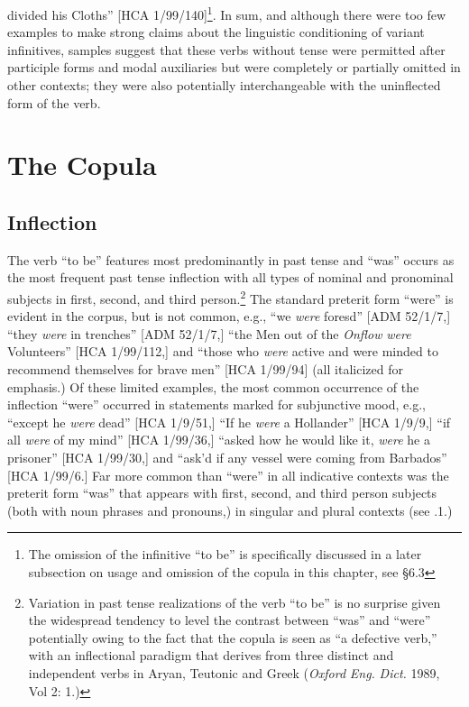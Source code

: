 divided his Cloths” [HCA 1/99/140]\footnote{The omission of the infinitive “to be” is specifically discussed in a later subsection on usage and omission of the copula in this chapter, see §6.3}. In sum, and although there were too few examples to make strong claims about the linguistic conditioning of variant infinitives, samples suggest that these verbs without tense were permitted after participle forms and modal auxiliaries but were completely or partially omitted in other contexts; they were also potentially interchangeable with the uninflected form of the verb.

\section{\textbf{The} \textbf{Copula}}%

\subsection{\textbf{Inflection}}%

  The verb “to be” features most predominantly in past tense and “was” occurs as the most frequent past tense inflection with all types of nominal and pronominal subjects in first, second, and third person.\footnote{Variation in past tense realizations of the verb “to be” is no surprise given the widespread tendency to level the contrast between “was” and “were” potentially owing to the fact that the copula is seen as “a defective verb,” with an inflectional paradigm that derives from three distinct and independent verbs in Aryan, Teutonic and Greek (\textit{Oxford} \textit{Eng.} \textit{Dict.} 1989, Vol 2: 1.)}  The standard preterit form “were” is evident in the corpus, but is not common, e.g., “we \textit{were} foresd” [ADM 52/1/7,] “they \textit{were} in trenches” [ADM 52/1/7,] “the Men out of the \textit{Onflow} \textit{were} Volunteers” [HCA 1/99/112,] and “those who \textit{were} active and were minded to recommend themselves for brave men” [HCA 1/99/94] (all italicized for emphasis.) Of these limited examples, the most common occurrence of the inflection “were” occurred in statements marked for subjunctive mood, e.g., “except he \textit{were} dead” [HCA 1/9/51,] “If he \textit{were} a Hollander” [HCA 1/9/9,] “if all \textit{were} of my mind” [HCA 1/99/36,] “asked how he would like it, \textit{were} he a prisoner” [HCA 1/99/30,] and “ask’d if any vessel were coming from Barbados” [HCA 1/99/6.] Far more common than “were” in all indicative contexts was the preterit form “was” that appears with first, second, and third person subjects (both with noun phrases and pronouns,) in singular and plural contexts (see .1.) 

